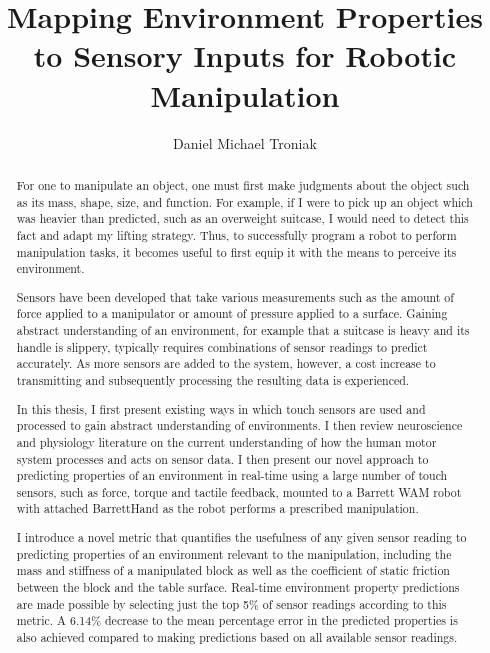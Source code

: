 \documentclass[msc,oneside]{ubcthesis}
\title{Mapping Environment Properties to Sensory Inputs for Robotic Manipulation}
\author{Daniel Michael Troniak}
\begin{document}
\frontmatter
\maketitle                      %

\begin{abstract}                %
For one to manipulate an object, one must first make judgments about the object such as its mass, shape, size, and function. For example, if I were to pick up an object which was heavier than predicted, such as an overweight suitcase, I would need to detect this fact and adapt my lifting strategy. Thus, to successfully program a robot to perform manipulation tasks, it becomes useful to first equip it with the means to perceive its environment. 

Sensors have been developed that take various measurements such as the amount of force applied to a manipulator or amount of pressure applied to a surface. Gaining abstract understanding of an environment, for example that a suitcase is heavy and its handle is slippery, typically requires combinations of sensor readings to predict accurately. As more sensors are added to the system, however, a cost increase to transmitting and subsequently processing the resulting data is experienced.

In this thesis, I first present existing ways in which touch sensors are used and processed to gain abstract understanding of environments. I then review neuroscience and physiology literature on the current understanding of how the human motor system processes and acts on sensor data. I then present our novel approach to predicting properties of an environment in real-time using a large number of touch sensors, such as force, torque and tactile feedback, mounted to a Barrett WAM robot with attached BarrettHand as the robot performs a prescribed manipulation.

I introduce a novel metric that quantifies the usefulness of any given sensor reading to predicting properties of an environment relevant to the manipulation, including the mass and stiffness of a manipulated block as well as the coefficient of static friction between the block and the table surface. Real-time environment property predictions are made possible by selecting just the top 5\% of sensor readings according to this metric. A 6.14\% decrease to the mean percentage error in the predicted properties is also achieved compared to making predictions based on all available sensor readings.
\end{abstract}
\end{document}
